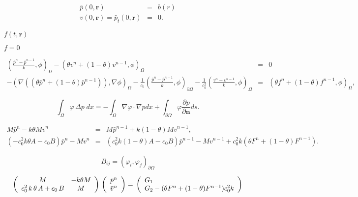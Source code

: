 \documentclass{article}
\begin{document}
\begin{eqnarray*} \bar{p}(0,\mathbf r) & = & b(r) \\ v(0,\mathbf r)=\bar{p}_t(0,\mathbf r) & = & 0. \end{eqnarray*}
\pagebreak

$f(t,\mathbf r)$
\pagebreak

$f=0$
\pagebreak

\begin{eqnarray*} \left(\frac{\bar{p}^n-\bar{p}^{n-1}}{k},\phi\right)_\Omega- \left(\theta v^{n}+(1-\theta)v^{n-1},\phi\right)_\Omega & = & 0 \\ -\left(\nabla((\theta\bar{p}^n+(1-\theta)\bar{p}^{n-1})),\nabla\phi\right)_\Omega- \frac{1}{c_0}\left(\frac{\bar{p}^n-\bar{p}^{n-1}}{k},\phi\right)_{\partial\Omega} - \frac{1}{c_0^2}\left(\frac{v^n-v^{n-1}}{k},\phi\right)_\Omega & = & \left(\theta f^{n}+(1-\theta)f^{n-1}, \phi\right)_\Omega, \end{eqnarray*}
\pagebreak

\[ \int_\Omega\varphi \, \Delta p\; dx = -\int_\Omega\nabla \varphi \cdot \nabla p dx + \int_{\partial\Omega}\varphi \frac{\partial p}{\partial {\mathbf n}}ds. \]
\pagebreak

\begin{eqnarray*} M\bar{p}^{n}-k \theta M v^n & = & M\bar{p}^{n-1}+k (1-\theta)Mv^{n-1},\\ (-c_0^2k \theta A-c_0 B)\bar{p}^n-Mv^{n} & = & (c_0^2k(1-\theta)A-c_0B)\bar{p}^{n-1}-Mv^{n-1}+c_0^2k(\theta F^{n}+(1-\theta)F^{n-1}). \end{eqnarray*}
\pagebreak

\[ B_{ij} = \left(\varphi_i,\varphi_j\right)_{\partial\Omega} \]
\pagebreak

\[ \left(\begin{array}{cc} M & -k\theta M \\ c_0^2\,k\,\theta\,A+c_0\,B & M \\ \end{array} \right)\\ \left(\begin{array}{c} \bar{p}^{n} \\ \bar{v}^{n} \end{array}\right)=\\ \left(\begin{array}{l} G_1 \\ G_2 -(\theta F^{n}+(1-\theta)F ^{n-1})c_{0}^{2}k \\ \end{array}\right) \]
\pagebreak
\end{document}
